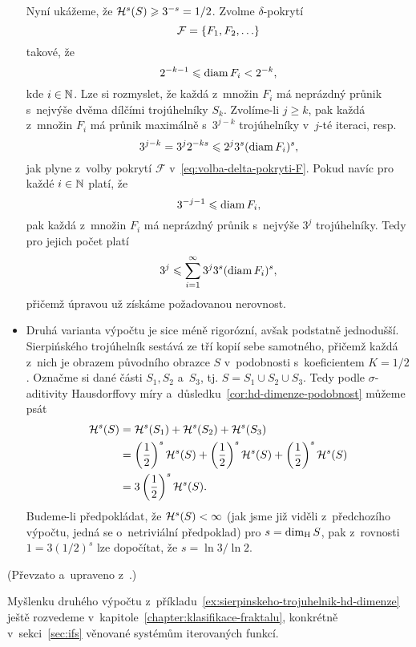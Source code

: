 \begin{example}
\begin{itemize}
        Nyní ukážeme, že $\mathcal{H}^{s}(S)\geqslant 3^{-s}=1/2$. Zvolme $\delta$-pokrytí
        \[\mathcal{F}=\left\{F_1,F_2,\ldots\right\}\]
        takové, že
        \begin{equation}\label{eq:volba-delta-pokryti-F}
            2^{-k-1}\leqslant\operatorname{diam}{F_i}<2^{-k},
        \end{equation}
        kde $i\in\mathbb{N}$. Lze si rozmyslet, že každá z~množin $F_i$ má neprázdný průnik s~nejvýše dvěma dílčími trojúhelníky $S_k$. Zvolíme-li $j\geqslant k$, pak každá z~množin $F_i$ má průnik maximálně s~$3^{j-k}$ trojúhelníky v~$j$-té iteraci, resp.
        \[3^{j-k}=3^j2^{-ks}\leqslant2^j3^s(\operatorname{diam}{F_i})^s,\]
        jak plyne z~volby pokrytí $\mathcal{F}$ v~\eqref{eq:volba-delta-pokryti-F}. Pokud navíc pro každé $i\in\mathbb{N}$ platí, že
        \[3^{-j-1}\leqslant\operatorname{diam}{F_i},\]
        pak každá z~množin $F_i$ má neprázdný průnik s~nejvýše $3^j$ trojúhelníky. Tedy pro jejich počet platí
        \[3^j\leqslant\sum_{i=1}^{\infty}3^j3^s(\operatorname{diam}{F_i})^s,\]
        přičemž úpravou už získáme požadovanou nerovnost.
        \item Druhá varianta výpočtu je sice méně rigorózní, avšak podstatně jednodušší. Sierpińského trojúhelník sestává ze tří kopií sebe samotného, přičemž každá z~nich je obrazem původního obrazce $S$ v~podobnosti s~koeficientem $K=1/2$. Označme si dané části $S_1,S_2$ a~$S_3$, tj. $S=S_1\cup S_2\cup S_3$. Tedy podle $\sigma$-aditivity Hausdorffovy míry a~důsledku~\ref{cor:hd-dimenze-podobnost} můžeme psát
        \begin{align*}
            \mathcal{H}^{s}(S)&=\mathcal{H}^{s}(S_1)+\mathcal{H}^{s}(S_2)+\mathcal{H}^{s}(S_3)\\
            &=\left(\dfrac{1}{2}\right)^s\mathcal{H}^{s}(S)+\left(\dfrac{1}{2}\right)^s\mathcal{H}^{s}(S)+\left(\dfrac{1}{2}\right)^s\mathcal{H}^{s}(S)\\
            &=3\left(\dfrac{1}{2}\right)^s\mathcal{H}^{s}(S).
        \end{align*}
        Budeme-li předpokládat, že $\mathcal{H}^{s}(S)<\infty$ (jak jsme již viděli z~předchozího výpočtu, jedná se o~netriviální předpoklad) pro $s=\operatorname{dim_H}{S}$, pak z~rovnosti $1=3(1/2)^s$ lze dopočítat, že $s=\ln{3}/\ln{2}$.
    \end{itemize}
\end{example}
(Převzato a~upraveno z~\citep[str. 53]{Falconer2014}.)

Myšlenku druhého výpočtu z~příkladu~\ref{ex:sierpinskeho-trojuhelnik-hd-dimenze} ještě rozvedeme v~kapitole~\ref{chapter:klasifikace-fraktalu}, konkrétně v~sekci~\ref{sec:ifs} věnované systémům iterovaných funkcí.

